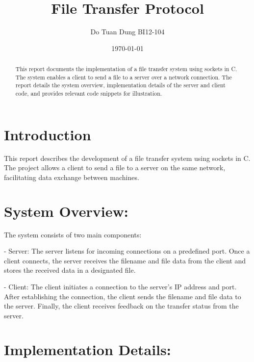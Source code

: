 \documentclass{article}
\title{File Transfer Protocol}
\author{Do Tuan Dung BI12-104}
\date{\today}
\begin{document}
\maketitle

\begin{abstract}
This report documents the implementation of a file transfer system using sockets in C. The system enables a client to send a file to a server over a network connection. The report details the system overview, implementation details of the server and client code, and provides relevant code snippets for illustration.
\end{abstract}

\section{Introduction}

This report describes the development of a file transfer system using sockets in C. The project allows a client to send a file to a server on the same network, facilitating data exchange between machines.

\section{System Overview:}
The system consists of two main components:

- Server: The server listens for incoming connections on a predefined port. Once a client connects, the server receives the filename and file data from the client and stores the received data in a designated file.

- Client: The client initiates a connection to the server's IP address and port. After establishing the connection, the client sends the filename and file data to the server. Finally, the client receives feedback on the transfer status from the server.
\section{Implementation Details:}
\end{document}
